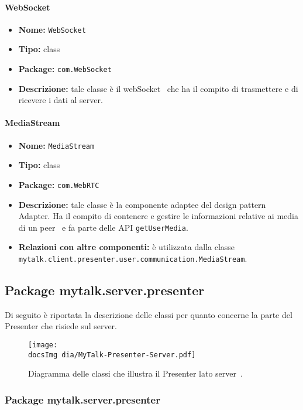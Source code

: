 \paragraph{WebSocket}{
	\begin{itemize}
		\item [] \textbf{Nome:} \texttt{WebSocket}
		\item [] \textbf{Tipo:} class
		\item [] \textbf{Package:} \texttt{com.WebSocket}
		\item [] \textbf{Descrizione:} tale classe è il webSocket\g~ che ha il compito di trasmettere e di ricevere i dati al server\g.
	\end{itemize}
}


\paragraph{MediaStream}{
	\begin{itemize}
		\item [] \textbf{Nome:} \texttt{MediaStream}
		\item [] \textbf{Tipo:} class
		\item [] \textbf{Package:} \texttt{com.WebRTC}
		\item [] \textbf{Descrizione:} tale classe è la componente adaptee del design pattern Adapter. Ha il compito di contenere e gestire le informazioni relative ai media di un peer\g~ e fa parte delle API \texttt{getUserMedia}.
		\item [] \textbf{Relazioni con altre componenti:} è utilizzata dalla classe\\ \texttt{mytalk.client.presenter.user.communication.MediaStream}.
	\end{itemize}
}

\newpage

\subsection{Package mytalk.server.presenter}
\noindent Di seguito è riportata la descrizione delle classi per quanto concerne la parte del Presenter che risiede sul server\g .

	\begin{figure}[h!tbp]
		\centering
		\texttt{[image: \\docsImg dia/MyTalk-Presenter-Server.pdf]}
		\caption{Diagramma delle classi che illustra il Presenter lato server\g~.}
	\end{figure}

\subsubsection{Package mytalk.server.presenter}
